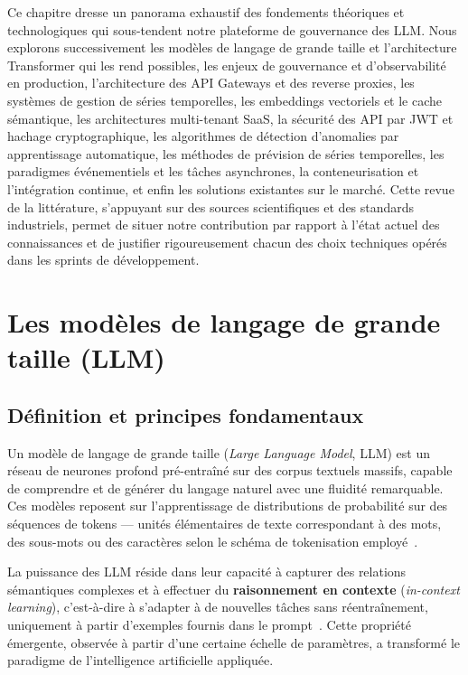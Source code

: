 Ce chapitre dresse un panorama exhaustif des fondements théoriques et technologiques qui sous-tendent notre plateforme de gouvernance des LLM. Nous explorons successivement les modèles de langage de grande taille et l'architecture Transformer qui les rend possibles, les enjeux de gouvernance et d'observabilité en production, l'architecture des API Gateways et des reverse proxies, les systèmes de gestion de séries temporelles, les embeddings vectoriels et le cache sémantique, les architectures multi-tenant SaaS, la sécurité des API par JWT et hachage cryptographique, les algorithmes de détection d'anomalies par apprentissage automatique, les méthodes de prévision de séries temporelles, les paradigmes événementiels et les tâches asynchrones, la conteneurisation et l'intégration continue, et enfin les solutions existantes sur le marché. Cette revue de la littérature, s'appuyant sur des sources scientifiques et des standards industriels, permet de situer notre contribution par rapport à l'état actuel des connaissances et de justifier rigoureusement chacun des choix techniques opérés dans les sprints de développement.

\section{Les modèles de langage de grande taille (LLM)}
\label{sec:llm}

\subsection{Définition et principes fondamentaux}

Un modèle de langage de grande taille (\textit{Large Language Model}, LLM) est un réseau de neurones profond pré-entraîné sur des corpus textuels massifs, capable de comprendre et de générer du langage naturel avec une fluidité remarquable. Ces modèles reposent sur l'apprentissage de distributions de probabilité sur des séquences de tokens --- unités élémentaires de texte correspondant à des mots, des sous-mots ou des caractères selon le schéma de tokenisation employé~\cite{brown2020}.

La puissance des LLM réside dans leur capacité à capturer des relations sémantiques complexes et à effectuer du \textbf{raisonnement en contexte} (\textit{in-context learning}), c'est-à-dire à s'adapter à de nouvelles tâches sans réentraînement, uniquement à partir d'exemples fournis dans le prompt~\cite{brown2020}. Cette propriété émergente, observée à partir d'une certaine échelle de paramètres, a transformé le paradigme de l'intelligence artificielle appliquée.

